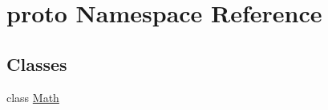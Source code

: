 \hypertarget{namespaceproto}{\section{proto Namespace Reference}
\label{namespaceproto}
}
\subsection*{Classes}
\begin{DoxyCompactItemize}
\item 
class \hyperlink{classproto_1_1_math}{Math}
\end{DoxyCompactItemize}
